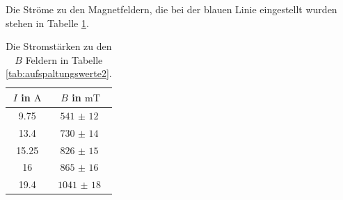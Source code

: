 \documentclass[
  bibliography=totoc,     %
  captions=tableheading,  %
  titlepage=firstiscover, %
]{scrartcl}
\begin{document}
\noindent
Die Ströme zu den Magnetfeldern, die bei der blauen Linie eingestellt wurden stehen
in Tabelle \ref{tab:ströme}.
\begin{table}[H]
  \centering
  \caption{Die Stromstärken zu den $B$ Feldern in Tabelle \ref{tab:aufspaltungswerte2}.}
  \label{tab:ströme}
  \begin{tabular}{c c}
    \toprule
    $I$ in $\si{\ampere}$ & $B$ in $\si{\milli\tesla}$ \\
    \midrule
    9.75  & $\SI{541(12)}{}$  \\
    13.4  & $\SI{730(14)}{}$  \\
    15.25 & $\SI{826(15)}{}$  \\
    16    & $\SI{865(16)}{}$  \\
    19.4  & $\SI{1041(18)}{}$ \\
    \bottomrule
  \end{tabular}
\end{table}
\clearpage
\end{document}
